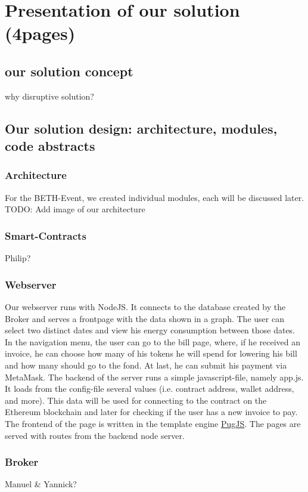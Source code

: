 \documentclass[11pt]{article}
\begin{document}
\section{Presentation of our solution (4pages)}
\subsection{our solution concept}
why disruptive solution?
\subsection{Our solution design: architecture, modules, code abstracts}
\subsubsection{Architecture}
For the BETH-Event, we created individual modules, each will be discussed later.
TODO: Add image of our architecture
\subsubsection{Smart-Contracts}
Philip?

\subsubsection{Webserver}
Our webserver runs  with NodeJS. It connects to the database created by the Broker and serves a frontpage with the data shown in a graph. The user can select two distinct dates and view his energy consumption between those dates. In the navigation menu, the user can go to the bill page, where, if he received an invoice, he can choose how many of his tokens he will spend for lowering his bill and how many should go to the fond. At last, he can submit his payment via MetaMask. The backend of the server runs a simple javascript-file, namely app.js. It loads from the config-file several values (i.e. contract address, wallet address, and more). This data will be used for connecting to the contract on the Ethereum blockchain and later for checking if the user has a new invoice to pay. The frontend of the page is written in the template engine \hyperref[https://pugjs.org]{PugJS}. The pages are served with routes from the backend node server.

\subsubsection{Broker}
Manuel \& Yannick?
\end{document}
